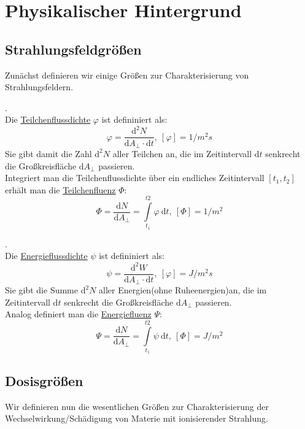\section{Physikalischer Hintergrund}
\subsection{Strahlungsfeldgrößen}
Zunächst definieren wir einige Größen zur Charakterisierung  von Strahlungsfeldern.

\begin{definition}.\\
Die \underline{Teilchenflussdichte} $\varphi$ ist defininiert als:
\begin{equation*}
	\varphi = \frac{\mathrm{d}^2N}{\mathrm{d}A_{\perp} \cdot \mathrm{d}t},\ [\varphi] = 1/m^2s
\end{equation*}
Sie gibt damit die Zahl $\mathrm{d}^2N$ aller Teilchen an, die im Zeitintervall $\mathrm{d}t$ senkrecht die Großkreisfläche $\mathrm{d}A_{\perp}$ passieren.\\
Integriert man die Teilchenflussdichte über ein endliches Zeitintervall $[t_1,t_2]$ erhält man die \underline{Teilchenfluenz} $\Phi$:
\begin{equation*}
	\Phi = \frac{\mathrm{d}N}{\mathrm{d}A_{\perp}} = \int\limits_{t_1}^{t2} \varphi \ \mathrm{d}t,\ [\Phi] = 1/m^2
\end{equation*}
\end{definition}

\begin{definition}.\\
	Die \underline{Energieflussdichte} $\psi$ ist defininiert als:
\begin{equation*}
	\psi = \frac{\mathrm{d}^2W}{\mathrm{d}A_{\perp} \cdot \mathrm{d}t},\ [\varphi] = J/m^2s
\end{equation*}
Sie gibt die Summe $\mathrm{d}^2N$ aller Energien(ohne Ruheenergien)an, die im Zeitintervall $\mathrm{d}t$ senkrecht die Großkreisfläche $\mathrm{d}A_{\perp}$ passieren.\\
Analog definiert man die \underline{Energiefluenz} $\Psi$:
\begin{equation*}
	\Psi = \frac{\mathrm{d}N}{\mathrm{d}A_{\perp}} = \int\limits_{t_1}^{t2} \psi \ \mathrm{d}t,\ 			[\Phi] = J/m^2
\end{equation*}
\end{definition}

\subsection{Dosisgrößen}
Wir definieren nun die wesentlichen Größen zur Charakterisierung der Wechselwirkung/Schädigung von Materie mit ionisierender Strahlung.

